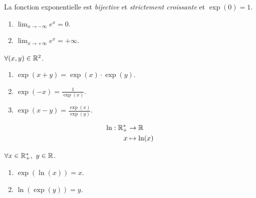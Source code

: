 \begin{proposition}
	La fonction exponentielle est \emph{bijective} et \emph{strictement croissante} et $\exp(0) = 1$.
    \begin{multicols}{2}
        \begin{enumerate}
            \item $\lim_{x \to -\infty} e^x = 0$.
            \item $\lim_{x \to +\infty} e^x = +\infty$.
        \end{enumerate}
    \end{multicols}
    \noindent $\forall (x, y) \in \mathbb{R}^2$.
    \begin{multicols}{2}
        \begin{enumerate}
            \item $\exp(x + y) = \exp(x) \cdot \exp(y)$.
            \item $\exp(-x) = \frac{1}{\exp(x)}$.
            \item $\exp(x - y) = \frac{\exp(x)}{\exp(y)}$.
        \end{enumerate}
    \end{multicols}
\end{proposition}

\begin{definition}
	\begin{align*}
		\ln : \mathbb{R}_+^* &\to \mathbb{R} \\
        x &\mapsto \ln(x)
	\end{align*}
\end{definition}

\begin{proposition}
	$\forall x \in \mathbb{R}_+^*,\ y \in \mathbb{R}$.
    \begin{multicols}{2}
        \begin{enumerate}
            \item $\exp(\ln(x)) = x$.
            \item $\ln(\exp(y)) = y$.
        \end{enumerate}
    \end{multicols}
\end{proposition}

